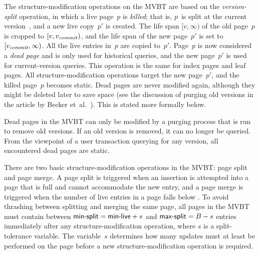 The structure-modification operations on the MVBT are based on the
\emph{version-split} operation, in which a live page~$p$ is \emph{killed};
that is, $p$~is split at the current version~\comver, and a new live
copy~$p'$ is created. 
The life span $[v,\infty)$ of the old page~$p$ is cropped to
$[v,\smash{v_{\text{\textit{commit}}}})$, and the life span of the new page~$p'$ is set to
$[\smash{v_{\text{\textit{commit}}}},\infty)$. 
All the live entries in~$p$ are copied to~$p'$. 
Page~$p$ is now considered a \textit{dead page} and is only used for
historical queries, and the new page~$p'$ is used for current-version
queries.
This operation is the same for index pages and leaf pages.
All structure-modification operations target the new page~$p'$, and 
the killed page~$p$ becomes static.
Dead pages are never modified again, although they might be deleted
later to save space (see the discussion of purging old versions in
the  article by Becker
et~al.~\cite{becker:1996:mvbt,becker:1993:optimal}). 
This is stated more formally below.

\thmskip
\begin{invariant}
\label{inv:mvbt-static-dead-page}
Dead pages in the MVBT can only be modified by a purging process that is run
to remove old versions.
If an old version is removed, it can no longer be queried.
From the viewpoint of a user transaction querying for any version, all
encountered dead pages are static.
\end{invariant}
\thmskip

There are two basic structure-modification operations in the MVBT: page split
and page merge.
A page split is triggered when an insertion is attempted into a page
that is full and cannot accommodate the new entry, and a page merge is
triggered when the number of live entries in a page falls below \minlive.
To avoid thrashing between splitting and merging the same page, all pages in
the MVBT must contain between $\text{\textsf{min-split}} = \text{\textsf{min-live}} +
s$\label{def:minsplit} and $\text{\textsf{max-split}} = B -
s$\label{def:maxsplit} entries immediately after any
structure-modification operation, where $s$ is a split-tolerance variable. 
The variable~$s$ determines how many updates must at least be performed
on the page before a new structure-modification operation is required.

